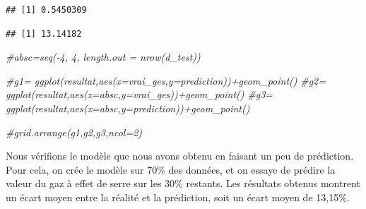 \documentclass[
]{article}
\newenvironment{Shaded}{\begin{snugshade}}{\end{snugshade}}
\newcommand{\CommentTok}[1]{\textcolor[rgb]{0.56,0.35,0.01}{\textit{#1}}}
\newcommand{\FunctionTok}[1]{\textcolor[rgb]{0.13,0.29,0.53}{\textbf{#1}}}
\newcommand{\NormalTok}[1]{#1}
\newcommand{\OtherTok}[1]{\textcolor[rgb]{0.56,0.35,0.01}{#1}}
\newcommand{\SpecialCharTok}[1]{\textcolor[rgb]{0.81,0.36,0.00}{\textbf{#1}}}
\begin{document}
\begin{Shaded}
\end{Shaded}

\begin{verbatim}
## [1] 0.5450309
\end{verbatim}

\begin{Shaded}
\end{Shaded}

\begin{verbatim}
## [1] 13.14182
\end{verbatim}

\begin{Shaded}
\begin{Highlighting}[]
\CommentTok{\#absc=seq({-}4, 4, length.out = nrow(d\_test))}

\CommentTok{\#g1= ggplot(resultat,aes(x=vrai\_ges,y=prediction))+geom\_point()}
\CommentTok{\#g2= ggplot(resultat,aes(x=absc,y=vrai\_ges))+geom\_point()}
\CommentTok{\#g3= ggplot(resultat,aes(x=absc,y=prediction))+geom\_point()}

\CommentTok{\#grid.arrange(g1,g2,g3,ncol=2)}
\end{Highlighting}
\end{Shaded}

Nous vérifions le modèle que nous avons obtenu en faisant un peu de
prédiction. Pour cela, on crée le modèle sur 70\% des données, et on
essaye de prédire la valeur du gaz à effet de serre sur les 30\%
restants. Les résultats obtenus montrent un écart moyen entre la réalité
et la prédiction, soit un écart moyen de 13,15\%.
\end{document}
